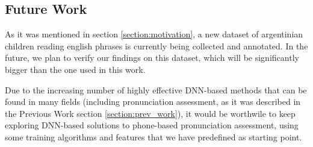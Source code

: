 \subsection{Future Work}

As it was mentioned in section \ref{section:motivation}, a new dataset of
argentinian children reading english phrases is currently being collected
and annotated. In the future, we plan to verify our findings on
this dataset, which will be significantly bigger than the one used in this work.



Due to the increasing number of highly effective DNN-based methods that can be found in
many fields (including pronunciation assessment,
as it was described in the Previous Work section \ref{section:prev_work}),
it would be worthwile to
keep exploring DNN-based solutions to phone-based pronunciation assessment, using
some training algorithms and features that we have predefined as starting point.



